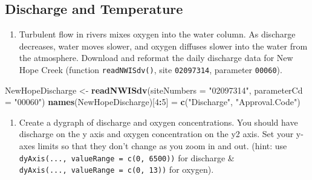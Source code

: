\documentclass[]{article}
\newenvironment{Shaded}{\begin{snugshade}}{\end{snugshade}}
\newcommand{\CommentTok}[1]{\textcolor[rgb]{0.56,0.35,0.01}{\textit{#1}}}
\newcommand{\DataTypeTok}[1]{\textcolor[rgb]{0.13,0.29,0.53}{#1}}
\newcommand{\DecValTok}[1]{\textcolor[rgb]{0.00,0.00,0.81}{#1}}
\newcommand{\KeywordTok}[1]{\textcolor[rgb]{0.13,0.29,0.53}{\textbf{#1}}}
\newcommand{\NormalTok}[1]{#1}
\newcommand{\OperatorTok}[1]{\textcolor[rgb]{0.81,0.36,0.00}{\textbf{#1}}}
\newcommand{\StringTok}[1]{\textcolor[rgb]{0.31,0.60,0.02}{#1}}
\providecommand{\tightlist}{%
  \setlength{\itemsep}{0pt}\setlength{\parskip}{0pt}}
\begin{document}
\hypertarget{discharge-and-temperature}{%
\subsection{Discharge and Temperature}\label{discharge-and-temperature}}

\begin{enumerate}
\def\labelenumi{\arabic{enumi}.}
\setcounter{enumi}{9}
\tightlist
\item
  Turbulent flow in rivers mixes oxygen into the water column. As
  discharge decreases, water moves slower, and oxygen diffuses slower
  into the water from the atmosphere. Download and reformat the daily
  discharge data for New Hope Creek (function \texttt{readNWISdv()},
  site \texttt{02097314}, parameter \texttt{00060}).
\end{enumerate}

\begin{Shaded}
\begin{Highlighting}[]
\NormalTok{NewHopeDischarge <-}\StringTok{ }\KeywordTok{readNWISdv}\NormalTok{(}\DataTypeTok{siteNumbers =} \StringTok{"02097314"}\NormalTok{,}
                               \DataTypeTok{parameterCd =} \StringTok{"00060"}\NormalTok{)}
\KeywordTok{names}\NormalTok{(NewHopeDischarge)[}\DecValTok{4}\OperatorTok{:}\DecValTok{5}\NormalTok{] =}\StringTok{ }\KeywordTok{c}\NormalTok{(}\StringTok{"Discharge"}\NormalTok{, }\StringTok{"Approval.Code"}\NormalTok{)}
\end{Highlighting}
\end{Shaded}

\begin{enumerate}
\def\labelenumi{\arabic{enumi}.}
\setcounter{enumi}{10}
\tightlist
\item
  Create a dygraph of discharge and oxygen concentrations. You should
  have discharge on the y axis and oxygen concentration on the y2 axis.
  Set your y-axes limits so that they don't change as you zoom in and
  out. (hint: use \texttt{dyAxis(...,\ valueRange\ =\ c(0,\ 6500))} for
  discharge \& \texttt{dyAxis(...,\ valueRange\ =\ c(0,\ 13))} for
  oxygen).
\end{enumerate}

\begin{Shaded}
\end{Shaded}
\end{document}
